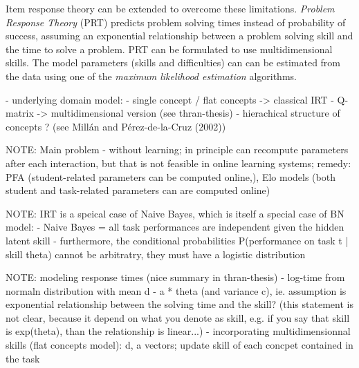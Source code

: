 Item response theory can be extended to overcome these limitations.
\emph{Problem Response Theory} (PRT)
\cite{alg.problem-response-theory, pelanek-student-modeling-times}
predicts problem solving times instead of probability of success,
assuming an exponential relationship between a problem solving skill
and the time to solve a problem.
PRT can be formulated to use multidimensional skills.
The model parameters (skills and difficulties) can can be estimated from the data
  using one of the \emph{maximum likelihood estimation} algorithms.

- underlying domain model:
  - single concept / flat concepts -> classical IRT
  - Q-matrix -> multidimensional version (see thran-thesis)
  - hierachical structure of concepts ? (see Millán and Pérez-de-la-Cruz (2002))



NOTE: Main problem - without learning; in principle can recompute parameters after
each interaction, but that is not feasible in online learning systems; remedy: PFA (student-related parameters can be computed online,), Elo models (both student and task-related parameters can are computed online)

NOTE: IRT is a speical case of Naive Bayes, which is itself a special case of BN model:
  - Naive Bayes = all task performances are independent given the hidden latent skill
  - furthermore, the conditional probabilities P(performance on task t | skill
  theta) cannot be arbitratry, they must have a logistic distribution

NOTE: modeling response times (nice summary in thran-thesis)
- log-time from normaln distribution with mean d - a * theta (and variance c),
  ie. assumption is exponential relationship between the solving time and the skill?
  (this statement is not clear, because it depend on what you denote as skill,
  e.g. if you say that skill is exp(theta), than the relationship is linear...)
- incorporating multidimensionnal skills (flat concepts model): d, a vectors; update skill of each concpet contained in the task


